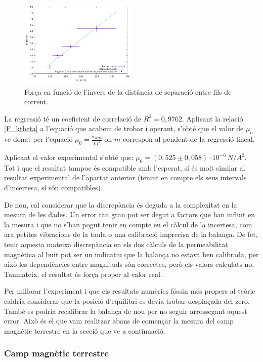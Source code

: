 \documentclass[11pt]{article}
\numberwithin{equation}{section}
\numberwithin{figure}{section}
\numberwithin{table}{section}
\begin{document}
\begin{figure}[H]
    \centering
    \includegraphics[width=0.5\textwidth]{PR2_regr_thetavsr.png}
    \caption{Força en funció de l’invers de la distància de separació entre fils de corrent.}
    \label{fig: PR2_regr_thetavsr}
\end{figure}

La regressió té un coeficient de correlació de $R^2 = 0,9762$.
Aplicant la relació \eqref{F_ktheta} a l'equació que acabem de trobar i operant, s’obté que el valor de $\mu_o$ ve donat per l’equació $\mu_0 = \frac{2\pi m}{LI^2}$ on $m$ correspon al pendent de la regressió lineal. 

Aplicant el valor experimental s’obté que: $\mu_0 = (0,525 \pm 0,058) \cdot 10^{-6}\, N/A^2$. Tot i que el resultat tampoc és compatible amb l’esperat, sí és molt similar al resultat experimental de l’apartat anterior (tenint en compte els seus intervals d'incertesa, sí són compatibles) . 

De nou, cal considerar que la discrepància és deguda a la complexitat en la mesura de les dades. Un error tan gran pot ser degut a factors que han influït en la mesura i que no s’han pogut tenir en compte en el càlcul de la incertesa, com ara petites vibracions de la taula o una calibració imprecisa de la balança. De fet, tenir aquesta mateixa discrepància en els dos càlculs de la permeabilitat magnètica al buit pot ser un indicatiu que la balança no estava ben calibrada, per això les dependències entre magnituds són correctes, però els valors calculats no. Tanmateix, el resultat és força proper al valor real.

Per millorar l'experiment i que els resultats numèrics fóssin més propers al teòric caldria considerar que la posició d'equilibri es devia trobar desplaçada del zero. També es podria recalibrar la balança de nou per no seguir arrossegant aquest error. Això és el que vam realitzar abans de començar la mesura del camp magnètic terrestre en la secció que ve a continuació.

\subsubsection{Camp magnètic terrestre}\label{sec: PR2_Bterra}
\end{document}

